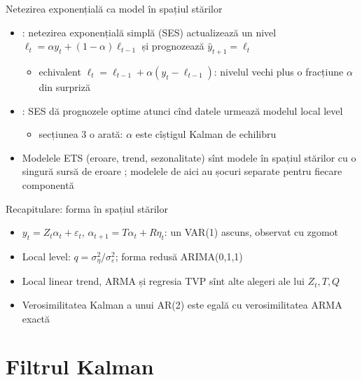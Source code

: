 \begin{frame}{Netezirea exponențială ca model în spațiul stărilor}
\itemsize{\small}
\begin{itemize}
    \item {}: netezirea exponențială simplă (SES) actualizează un nivel $\ell_t = \alpha y_t + (1-\alpha)\ell_{t-1}$ și prognozează $\hat y_{t+1} = \ell_t$
    \begin{itemize}
        \item echivalent $\ell_t = \ell_{t-1} + \alpha(y_t - \ell_{t-1})$: nivelul vechi plus o fracțiune $\alpha$ din surpriză
    \end{itemize}
    \item {}: SES dă prognozele optime atunci cînd datele urmează modelul local level
    \begin{itemize}
        \item secțiunea 3 o arată: $\alpha$ este cîștigul Kalman de echilibru
    \end{itemize}
    \item Modelele ETS (eroare, trend, sezonalitate) sînt modele în spațiul stărilor cu o singură sursă de eroare ; modelele de aici au șocuri separate pentru fiecare componentă
\end{itemize}
\end{frame}

\begin{frame}{Recapitulare: forma în spațiul stărilor}
\itemsize{\small}
\begin{itemize}
    \item $y_t = Z_t\alpha_t + \varepsilon_t$, $\alpha_{t+1} = T\alpha_t + R\eta_t$: un VAR(1) ascuns, observat cu zgomot
    \item Local level: $q = \sigma^2_\eta/\sigma^2_\varepsilon$; forma redusă ARIMA(0,1,1)
    \item Local linear trend, ARMA și regresia TVP sînt alte alegeri ale lui $Z_t, T, Q$
    \item Verosimilitatea Kalman a unui AR(2) este egală cu verosimilitatea ARMA exactă
\end{itemize}
\end{frame}


\section{Filtrul Kalman}

